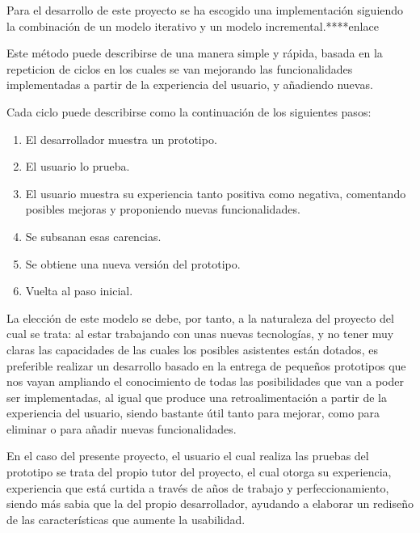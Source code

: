 Para el desarrollo de este proyecto se ha escogido una implementación siguiendo la combinación de un modelo iterativo y un modelo incremental.****enlace

Este método puede describirse de una manera simple y rápida, basada en la repeticion de ciclos en los cuales se van mejorando las funcionalidades implementadas a partir de la experiencia del usuario, y añadiendo nuevas.

Cada ciclo puede describirse como la continuación de los siguientes pasos:

\begin{enumerate}
    \item El desarrollador muestra un prototipo.
    \item El usuario lo prueba.
    \item El usuario muestra su experiencia tanto positiva como negativa, comentando posibles mejoras y proponiendo nuevas funcionalidades.
    \item Se subsanan esas carencias.
    \item Se obtiene una nueva versión del prototipo.
    \item Vuelta al paso inicial.
\end{enumerate}{}

La elección de este modelo se debe, por tanto, a la naturaleza del proyecto del cual se trata: al estar trabajando con unas nuevas tecnologías, y no tener muy claras las capacidades de las cuales los posibles asistentes están dotados, es preferible realizar un desarrollo basado en la entrega de pequeños prototipos que nos vayan ampliando el conocimiento de todas las posibilidades que van a poder ser implementadas, al igual que produce una retroalimentación a partir de la experiencia del usuario, siendo bastante útil tanto para mejorar, como para eliminar o para añadir nuevas funcionalidades.

En el caso del presente proyecto, el usuario el cual realiza las pruebas del prototipo se trata del propio tutor del proyecto, el cual otorga su experiencia, experiencia que está curtida a través de años de trabajo y perfeccionamiento, siendo más sabia que la del propio desarrollador, ayudando a elaborar un rediseño de las características que aumente la usabilidad. 